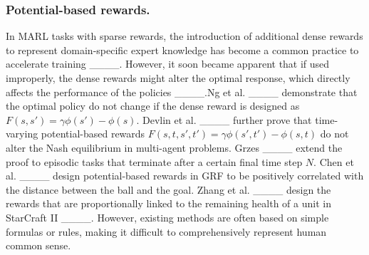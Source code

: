 \subsubsection{Potential-based rewards.}In MARL tasks with sparse rewards, the introduction of additional dense rewards to represent domain-specific expert knowledge has become a common practice to accelerate training ____. However, it soon became apparent that if used improperly, the dense rewards might alter the optimal response, which directly affects the performance of the policies ____.Ng et al. ____ demonstrate that the optimal policy do not change if the dense reward is designed as $F(s,s')=\gamma\phi(s')-\phi(s)$. Devlin et al. ____ further prove that time-varying potential-based rewards $F(s,t,s',t')=\gamma\phi(s',t')-\phi(s,t)$ do not alter the Nash equilibrium in multi-agent problems. Grzes ____ extend the proof to episodic tasks that terminate after a certain final time step $N$. Chen et al. ____ design potential-based rewards in GRF to be positively correlated with the distance between the ball and the goal. Zhang et al. ____ design the rewards that are proportionally linked to the remaining health of a unit in StarCraft II ____. However, existing methods are often based on simple formulas or rules, making it difficult to comprehensively represent human common sense.